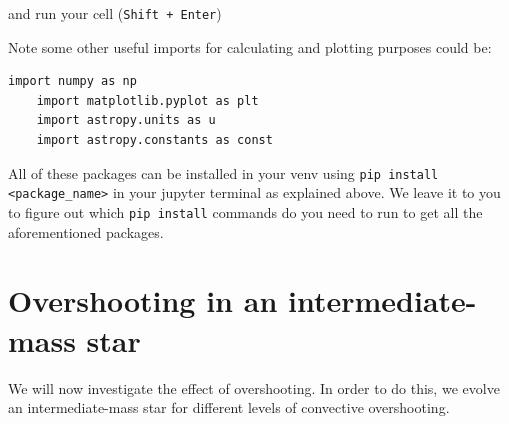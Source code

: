 \documentclass[11pt,a4paper]{article}
\begin{document}
\begin{itemize}
  and run your cell (\texttt{Shift + Enter})

  Note some other useful imports for calculating and plotting purposes could be:
  \begin{lstlisting}[style=pythonstyle]
    import numpy as np
    import matplotlib.pyplot as plt
    import astropy.units as u
    import astropy.constants as const
  \end{lstlisting}

  All of these packages can be installed in your venv using \texttt{pip install <package\_name>} in your jupyter terminal as explained above. We leave it to you to figure out which \texttt{pip install} commands do you need to run to get all the aforementioned packages. 

\end{itemize}






\section{Overshooting in an intermediate-mass star}

We will now investigate the effect of overshooting. In order to do this, we evolve an intermediate-mass star for different levels of convective overshooting.
\end{document}
